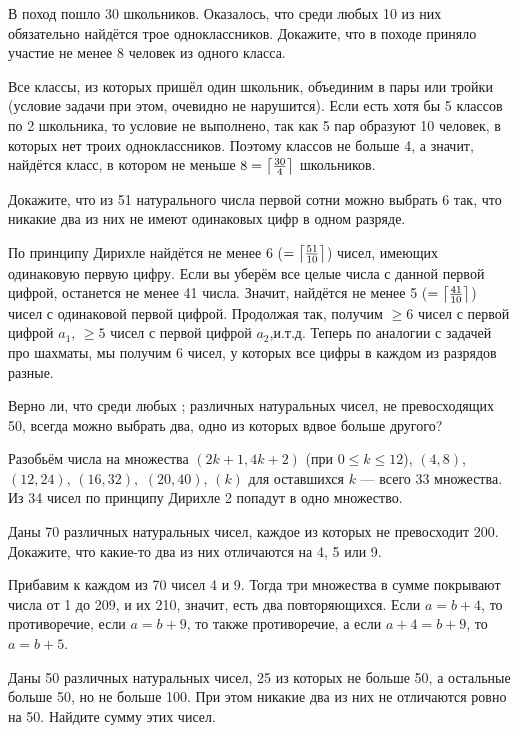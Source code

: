 \documentclass[12pt,a4paper]{article}
\begin{document}
 В поход пошло 30 школьников. Оказалось, что среди любых 10 из них обязательно найдётся трое одноклассников. Докажите, что в походе приняло участие не менее 8 человек из одного класса.

 Все классы, из которых пришёл один школьник, объединим в пары или тройки (условие задачи при этом, очевидно не нарушится). Если есть хотя бы 5 классов по 2 школьника, то условие не выполнено, так как 5 пар образуют 10 человек, в которых нет троих одноклассников. Поэтому классов не больше 4, а значит, найдётся класс, в котором не меньше $8=\left\lceil\frac{30}{4}\right\rceil$ школьников. 

  Докажите, что из 51 натурального числа первой сотни можно выбрать 6 так, что никакие два из них не имеют одинаковых цифр в одном разряде.

 По принципу Дирихле найдётся не менее 6 ($=\left\lceil\frac{51}{10}\right\rceil$) чисел, имеющих одинаковую первую цифру. Если вы уберём все целые числа с данной первой цифрой, останется не менее 41 числа. Значит, найдётся не менее 5 ($=\left\lceil\frac{41}{10}\right\rceil$) чисел с одинаковой первой цифрой. Продолжая так, получим $\geq 6$ чисел с первой цифрой $a_1$,  $\geq 5$ чисел с первой цифрой $a_2$,и.т.д. Теперь по аналогии с задачей про шахматы, мы получим 6 чисел, у которых все цифры в каждом из разрядов разные.

 Верно ли, что среди любых ;  различных натуральных чисел, не превосходящих 50, всегда можно выбрать два, одно из которых вдвое больше другого?

  Разобьём числа на множества $(2k+1,4k+2)$ (при $0 \leq k \leq 12$), $(4,8)$, $(12,24)$, $(16,32),$ $(20,40)$,  $(k)$ для оставшихся $k$ --- всего 33 множества. Из 34 чисел по принципу Дирихле 2 попадут в одно множество.

 Даны 70 различных натуральных чисел, каждое из которых не превосходит 200. Докажите, что какие-то два из них отличаются на 4, 5 или 9.

 Прибавим к каждом из 70 чисел 4 и 9. Тогда три множества в сумме покрывают числа от 1 до 209, и их 210, значит, есть два повторяющихся. Если $a = b+4$, то противоречие, если $a=b+9$, то также противоречие, а если $a+4=b+9$, то $a=b+5$.



  Даны 50 различных натуральных чисел, 25 из которых не больше 50, а остальные больше 50, но не больше 100. При этом никакие два из них не отличаются ровно на 50. Найдите сумму этих чисел.
\end{document}
